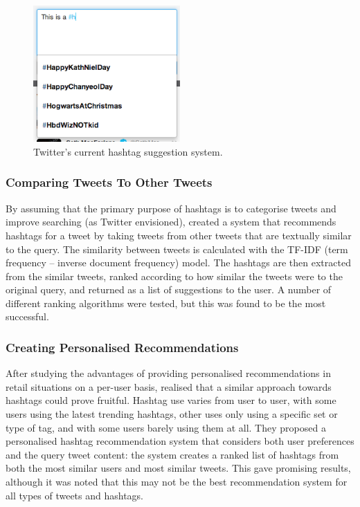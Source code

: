 \documentclass[12pt,a4paper]{article}
\begin{document}
\begin{figure}
    \centering
    \includegraphics[width=0.5\textwidth]{twittersuggest.png}
    \caption{Twitter's current hashtag suggestion system.\label{fig:twittersuggest}}
\end{figure}

\subsubsection{Comparing Tweets To Other Tweets}
By assuming that the primary purpose of hashtags is to categorise tweets and improve searching (as Twitter envisioned), \textcite{Zangerle:2011} created a system that recommends hashtags for a tweet by taking tweets from other tweets that are textually similar to the query. The similarity between tweets is calculated with the TF-IDF (term frequency -- inverse document frequency) model. The hashtags are then extracted from the similar tweets, ranked according to how similar the tweets were to the original query, and returned as a list of suggestions to the user. A number of different ranking algorithms were tested, but this was found to be the most successful.

\subsubsection{Creating Personalised Recommendations}
After studying the advantages of providing personalised recommendations in retail situations on a per-user basis, \textcite{Kywe:2012} realised that a similar approach towards hashtags could prove fruitful. Hashtag use varies from user to user, with some users using the latest trending hashtags, other uses only using a specific set or type of tag, and with some users barely using them at all. They proposed a personalised hashtag recommendation system that considers both user preferences and the query tweet content: the system creates a ranked list of hashtags from both the most similar users and most similar tweets. This gave promising results, although it was noted that this may not be the best recommendation system for all types of tweets and hashtags.
\end{document}

